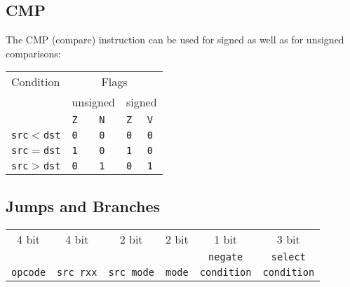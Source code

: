 \documentclass{leaflet}
\begin{document}
  \subsection{CMP}
   The CMP (compare) instruction can be used for signed as well as for unsigned
   comparisons:
   \begin{center}
    \vspace*{-2mm}
    \begin{longtable}{|l|l|l|l|l|}
     \hline
     Condition&\multicolumn{4}{|c|}{Flags}\\
              &\multicolumn{2}{|c|}{unsigned}&\multicolumn{2}{|c|}{signed}\\
              &\texttt{Z}&\texttt{N}&\texttt{Z}&\texttt{V}\\
     \hline
     \hline
     \texttt{src}$<$\texttt{dst}&\texttt{0}&\texttt{0}&\texttt{0}&\texttt{0}\\
     \texttt{src}$=$\texttt{dst}&\texttt{1}&\texttt{0}&\texttt{1}&\texttt{0}\\
     \texttt{src}$>$\texttt{dst}&\texttt{0}&\texttt{1}&\texttt{0}&\texttt{1}\\
     \hline
    \end{longtable}
    \vspace*{-14mm}
   \end{center}
%
  \subsection{Jumps and Branches}
   {\scriptsize
    \begin{center}
     \begin{longtable}{|c||c|c||c||c|c|}
      \hline
      4 bit&4 bit&2 bit&2 bit&1 bit&3 bit\\
      &     &     &     &{\tt negate}&{\tt select}\\
      {\tt opcode}&{\tt src rxx}&{\tt src mode}&
      {\tt mode}&{\tt condition}&{\tt condition}\\
      \hline
     \end{longtable}
    \end{center}
   }
   \vspace*{-13mm}
%
\end{document}
